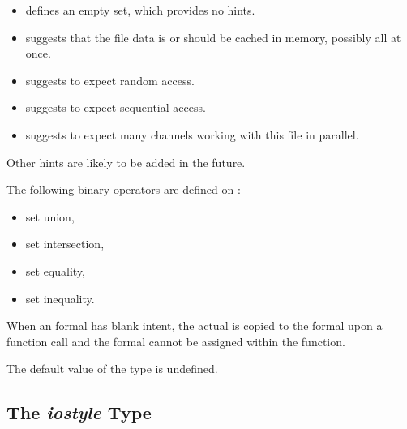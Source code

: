 \begin{itemize}

\item {} defines an empty set, which provides no hints.

\item {} suggests that the file data is or should be
      cached in memory, possibly all at once.

\item {} suggests to expect random access.

\item {} suggests to expect sequential access.

\item {} suggests to expect many channels
      working with this file in parallel.

\end{itemize}

\begin{future}
Other hints are likely to be added in the future.
\end{future}

The following binary operators are defined on :

\begin{itemize}

\item \chpl{|} set union,

\item \chpl{&} set intersection,

\item \chpl{==} set equality,

\item \chpl{!=} set inequality.

\end{itemize}

When an  formal has blank intent, the
actual is copied to the formal upon a function call and
the formal cannot be assigned within the function.

The default value of the  type is undefined.


\subsection{The {\em iostyle} Type}
\label{IO_iostyle_type}

